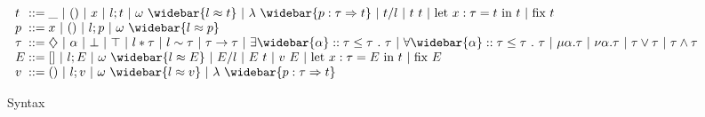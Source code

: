 \documentclass[sigplan,screen]{acmart}
\begin{document}
\begin{figure*}[h]
  \[
    \begin{array}{l @{} l}
      t 
      &{} ::=
      \begin{array}[t]{@{} l}
        \_ 
        \ |\ 
        () 
        \ |\ 
        x
        \ |\ 
        l;t 
        \ |\ 
        \omega\ \widebar{l \approx t}
        \ |\ 
        \lambda\ \widebar{p : \tau \Rightarrow t} 
        \ |\ 
        t/l
        \ |\ 
        t\ t
        \ |\ 
        \text{let } x : \tau = t\ \text{in } t
        \ |\ 
        \text{fix } t
      \end{array}
      \\
      p 
      &{} ::=
      \begin{array}[t]{@{} l}
        x 
        \ |\ 
        () 
        \ |\ 
        l;p
        \ |\ 
        \omega\ \widebar{l \approx p}
      \end{array}
      \\
      \tau
      &{} ::=
      \begin{array}[t]{@{} l}
        \diamondsuit 
        \ |\ 
        \alpha 
        \ |\ 
        \bot 
        \ |\ 
        \top 
        \ |\ 
        l*\tau 
        \ |\ 
        l\sim\tau 
        \ |\ 
        \tau\rightarrow\tau 
        \ |\ 
        \exists \widebar{\alpha} :: \tau \leq \tau \ .\ \tau 
        \ |\ 
        \forall \widebar{\alpha} :: \tau \leq \tau \ .\ \tau 
        \ |\ 
        \mu \alpha.\tau 
        \ |\ 
        \nu \alpha.\tau 
        \ |\ 
        \tau \vee \tau
        \ |\ 
        \tau \wedge \tau
      \end{array}
      \\
      E 
      &{} ::=
      []
      \ |\ 
      l;E 
      \ |\ 
      \omega\ \widebar{l \approx E}
      \ |\ 
      E/l
      \ |\ 
      E\ t
      \ |\ 
      v\ E
      \ |\ 
      \text{let } x : \tau = E\ \text{in } t
      \ |\ 
      \text{fix } E 
      \\
      v 
      &{} ::=
      \begin{array}[t]{@{} l}
        () 
        \ |\ 
        l;v
        \ |\ 
        \omega\ \widebar{l \approx v}
        \ |\ 
        \lambda\ \widebar{p : \tau \Rightarrow t} 
      \end{array}
    \end{array}
  \]
  \caption{Syntax}
\end{figure*}
\end{document}
